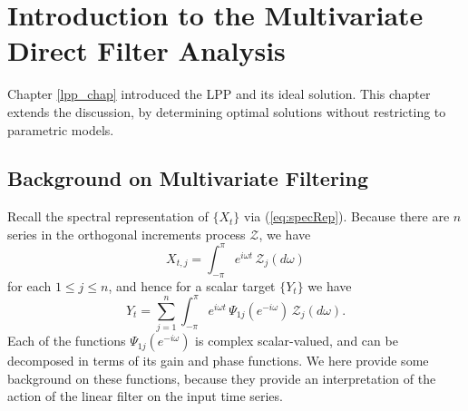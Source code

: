 \documentclass[a4paper]{book}
\begin{document}


\chapter{Introduction to the Multivariate Direct Filter Analysis}

Chapter \ref{lpp_chap} introduced the LPP and its ideal solution.  This chapter
 extends the discussion, by determining optimal solutions without restricting
 to parametric models.

\section{Background on Multivariate Filtering}

 Recall the spectral representation of $\{ X_t \}$ via (\ref{eq:specRep}).  Because 
 there are $n$ series in the orthogonal increments process $\mathcal{Z}$, we have
\[
  X_{t,j} = \int_{-\pi}^{\pi} e^{i \omega t} \, \mathcal{Z}_j (d\omega )
\] 
 for each $1 \leq j \leq n$, and hence for a scalar target $\{ Y_t \}$ we have
\begin{equation}
 \label{eq:spec-rep.partial}
  Y_t = \sum_{j=1}^n  \int_{-\pi}^{\pi} e^{i \omega  t} \, \Psi_{1 j} (e^{-i \omega }) \,
   \mathcal{Z}_j (d\omega ).
\end{equation}
  Each of the functions $\Psi_{1j} (e^{-i \omega })$ is complex scalar-valued, and
 can be decomposed in terms of its gain and phase functions.   We here provide some
 background on these functions, because they provide an interpretation of the action
 of the linear filter on the input time series.
\end{document}
